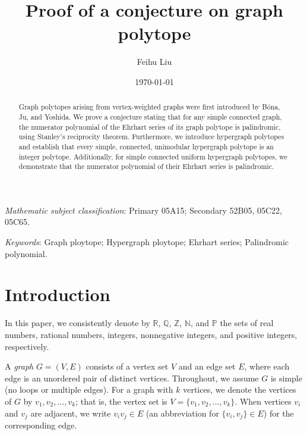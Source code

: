 \documentclass[reqno, 12pt]{amsart}
\title{Proof of a conjecture on graph polytope}
\author{Feihu Liu}
\date{\today}
\theoremstyle{mydefinition}
\theoremstyle{myremark}
\begin{document}
\maketitle

\begin{abstract}
Graph polytopes arising from vertex-weighted graphs were first introduced by B\'ona, Ju, and Yoshida.
We prove a conjecture stating that for any simple connected graph, the numerator polynomial of the Ehrhart series of its graph polytope is palindromic, using Stanley's reciprocity theorem.
Furthermore, we introduce hypergraph polytopes and establish that every simple, connected, unimodular hypergraph polytope is an integer polytope.
Additionally, for simple connected uniform hypergraph polytopes, we demonstrate that the numerator polynomial of their Ehrhart series is palindromic.
\end{abstract}


\def\D{{\mathcal{D}}}

\noindent
\begin{small}
 \emph{Mathematic subject classification}: Primary 05A15; Secondary 52B05, 05C22, 05C65.
\end{small}

\noindent
\begin{small}
\emph{Keywords}: Graph ploytope; Hypergraph ploytope; Ehrhart series; Palindromic polynomial.
\end{small}


\section{Introduction}
In this paper, we consistently denote by $\mathbb{R}$, $\mathbb{Q}$, $\mathbb{Z}$, $\mathbb{N}$, and $\mathbb{P}$ the sets of real numbers, rational numbers, integers, nonnegative integers, and positive integers, respectively.

A \emph{graph} $G = (V, E)$ consists of a vertex set $V$ and an edge set $E$, where each edge is an unordered pair of distinct vertices. Throughout, we assume $G$ is simple (no loops or multiple edges). For a graph with $k$ vertices, we denote the vertices of $G$ by $v_1, v_2, \ldots, v_k$; that is, the vertex set is $V = \{v_1, v_2, \ldots, v_k\}$. When vertices $v_i$ and $v_j$ are adjacent, we write $v_iv_j \in E$ (an abbreviation for $\{v_i, v_j\}\in E$) for the corresponding edge.
\end{document}
